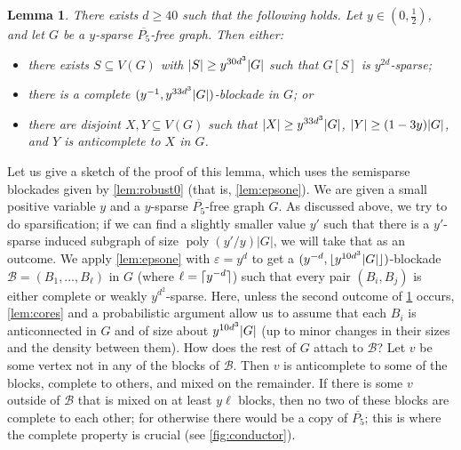 \documentclass[11pt,reqno,a4paper]{amsart}
\newtheorem{lemma}[theorem]{Lemma}
\newcommand{\mac}{\mathcal}
\newcommand{\eps}{\varepsilon}
\renewcommand{\subset}{\subseteq}
\newcommand{\poly}{\operatorname{poly}}
\DeclarePairedDelimiter\abs{\lvert}{\rvert}%
\DeclarePairedDelimiter\ceil{\lceil}{\rceil}%
\DeclarePairedDelimiter\floor{\lfloor}{\rfloor}%
\begin{document}
	\begin{lemma}
		\label{lem:house6}
		There exists $d\ge40$ such that the following holds.
		Let $y\in(0,\frac12)$, and let $G$ be a $y$-sparse $\overline{P_5}$-free graph.
		Then either:
		\begin{itemize}
			\item there exists $S\subset V(G)$ with $\abs S\ge y^{30d^3}\abs G$ such that $G[S]$ is $y^{2d}$-sparse;
			
			\item there is a complete $(y^{-1},y^{33d^3}\abs G)$-blockade in $G$; or
			
			\item there are disjoint $X,Y\subset V(G)$ such that $\abs X\ge y^{33d^3}\abs G$, $\abs Y\ge(1-3y)\abs G$, and $Y$ is anticomplete to $X$ in $G$.
		\end{itemize}
	\end{lemma}
	
	Let us give a sketch of the proof of this lemma, which uses 
	the semisparse blockades given by \cref{lem:robust0} (that is, \cref{lem:epsone}).
	We are given a small positive variable $y$ and a $y$-sparse $\overline{P_5}$-free graph $G$. As discussed above, we try to do sparsification;
	if we can find a slightly smaller value $y'$ such that there is a $y'$-sparse induced subgraph of size $\poly(y'/y)|G|$,
	we will take that as an outcome. 
	We apply \cref{lem:epsone} with $\eps=y^d$ to get a $(y^{-d},\floor{y^{10d^3}\abs G})$-blockade $\mac B=(B_1,\ldots,B_{\ell})$ in $G$ (where $\ell=\ceil{y^{-d}}$) such that every pair $(B_i,B_j)$ is either complete or weakly $y^{d^2}$-sparse.
	Here, unless the second outcome of \cref{lem:house6} occurs, \cref{lem:cores} and a probabilistic argument allow us to assume that each $B_i$ is anticonnected in $G$ and of size about $y^{10d^3}\abs G$ (up to minor changes in their sizes and the density between them).
	How does the rest of $G$ attach to $\mac B$? Let $v$ be some vertex not in any of the blocks of $\mac B$. Then $v$
	is anticomplete to some of the blocks, complete to others, and mixed on the remainder.
	If there is some $v$ outside of $\mac B$ that is mixed on at least $y\ell$ blocks,
	then no two of these blocks are complete to each other;
	for otherwise there would be a copy of $\overline{P_5}$; this is where the complete property is crucial 
	(see \cref{fig:conductor}).
	
\end{document}
